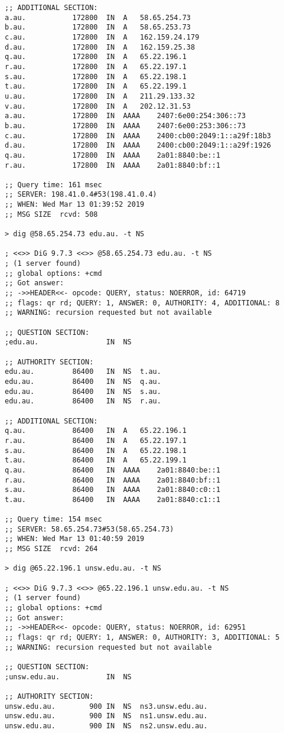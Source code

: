 \documentclass{article}
\begin{document}
\begin{lstlisting}
;; ADDITIONAL SECTION:
a.au.			172800	IN	A	58.65.254.73
b.au.			172800	IN	A	58.65.253.73
c.au.			172800	IN	A	162.159.24.179
d.au.			172800	IN	A	162.159.25.38
q.au.			172800	IN	A	65.22.196.1
r.au.			172800	IN	A	65.22.197.1
s.au.			172800	IN	A	65.22.198.1
t.au.			172800	IN	A	65.22.199.1
u.au.			172800	IN	A	211.29.133.32
v.au.			172800	IN	A	202.12.31.53
a.au.			172800	IN	AAAA	2407:6e00:254:306::73
b.au.			172800	IN	AAAA	2407:6e00:253:306::73
c.au.			172800	IN	AAAA	2400:cb00:2049:1::a29f:18b3
d.au.			172800	IN	AAAA	2400:cb00:2049:1::a29f:1926
q.au.			172800	IN	AAAA	2a01:8840:be::1
r.au.			172800	IN	AAAA	2a01:8840:bf::1

;; Query time: 161 msec
;; SERVER: 198.41.0.4#53(198.41.0.4)
;; WHEN: Wed Mar 13 01:39:52 2019
;; MSG SIZE  rcvd: 508

> dig @58.65.254.73 edu.au. -t NS 

; <<>> DiG 9.7.3 <<>> @58.65.254.73 edu.au. -t NS
; (1 server found)
;; global options: +cmd
;; Got answer:
;; ->>HEADER<<- opcode: QUERY, status: NOERROR, id: 64719
;; flags: qr rd; QUERY: 1, ANSWER: 0, AUTHORITY: 4, ADDITIONAL: 8
;; WARNING: recursion requested but not available

;; QUESTION SECTION:
;edu.au.				IN	NS

;; AUTHORITY SECTION:
edu.au.			86400	IN	NS	t.au.
edu.au.			86400	IN	NS	q.au.
edu.au.			86400	IN	NS	s.au.
edu.au.			86400	IN	NS	r.au.

;; ADDITIONAL SECTION:
q.au.			86400	IN	A	65.22.196.1
r.au.			86400	IN	A	65.22.197.1
s.au.			86400	IN	A	65.22.198.1
t.au.			86400	IN	A	65.22.199.1
q.au.			86400	IN	AAAA	2a01:8840:be::1
r.au.			86400	IN	AAAA	2a01:8840:bf::1
s.au.			86400	IN	AAAA	2a01:8840:c0::1
t.au.			86400	IN	AAAA	2a01:8840:c1::1

;; Query time: 154 msec
;; SERVER: 58.65.254.73#53(58.65.254.73)
;; WHEN: Wed Mar 13 01:40:59 2019
;; MSG SIZE  rcvd: 264

> dig @65.22.196.1 unsw.edu.au. -t NS

; <<>> DiG 9.7.3 <<>> @65.22.196.1 unsw.edu.au. -t NS
; (1 server found)
;; global options: +cmd
;; Got answer:
;; ->>HEADER<<- opcode: QUERY, status: NOERROR, id: 62951
;; flags: qr rd; QUERY: 1, ANSWER: 0, AUTHORITY: 3, ADDITIONAL: 5
;; WARNING: recursion requested but not available

;; QUESTION SECTION:
;unsw.edu.au.			IN	NS

;; AUTHORITY SECTION:
unsw.edu.au.		900	IN	NS	ns3.unsw.edu.au.
unsw.edu.au.		900	IN	NS	ns1.unsw.edu.au.
unsw.edu.au.		900	IN	NS	ns2.unsw.edu.au.


\end{lstlisting}
\end{document}
